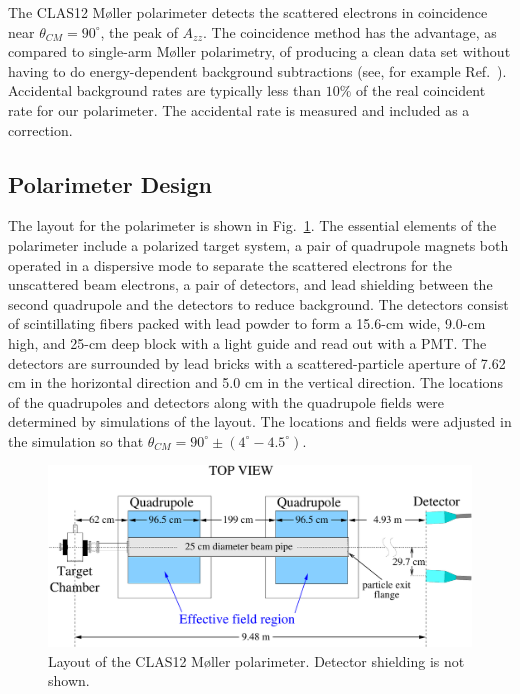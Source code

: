 The CLAS12 M{\o}ller polarimeter detects the scattered electrons in coincidence near $\theta_{CM}=90^\circ$, the peak of $A_{zz}$.  
The coincidence method has the advantage, as compared to 
single-arm M{\o}ller polarimetry, of producing a clean data set without having to do 
energy-dependent background subtractions (see, for example Ref.~\cite{arrington92}). Accidental background rates are typically less than
$10\%$ of the real coincident rate for our polarimeter. The accidental rate is measured and included as a correction.

\subsection{Polarimeter Design}
\label{sec-PolDesign}

The layout for the polarimeter is shown in Fig.~\ref{fig-PolLayout}. The essential elements of the polarimeter include a polarized target 
system, a pair of quadrupole magnets both operated in a dispersive mode to separate the scattered electrons for the unscattered  
beam electrons, a pair of detectors, and lead shielding between the second quadrupole and the detectors to reduce 
background.  The detectors consist of scintillating fibers packed with lead powder to form a 15.6-cm wide, 9.0-cm high, and 25-cm deep 
block with a light guide and read out with a PMT. The detectors are surrounded by 
lead bricks with a scattered-particle aperture of 7.62 cm in the horizontal direction and 5.0 cm in the vertical direction.
The locations of the quadrupoles and detectors along with the quadrupole fields were determined by simulations of the layout. The 
locations and fields were adjusted in the simulation so that $\theta_{CM}=90^\circ\pm (4^\circ-4.5^\circ)$.

\begin{figure}[hbtp]
 \begin{center}
  \includegraphics[width=\textwidth]{MPLayout.pdf}
 \end{center}
 \caption[]{Layout of the CLAS12 M{\o}ller polarimeter. Detector shielding is not shown.}
 \label{fig-PolLayout}
\end{figure}


